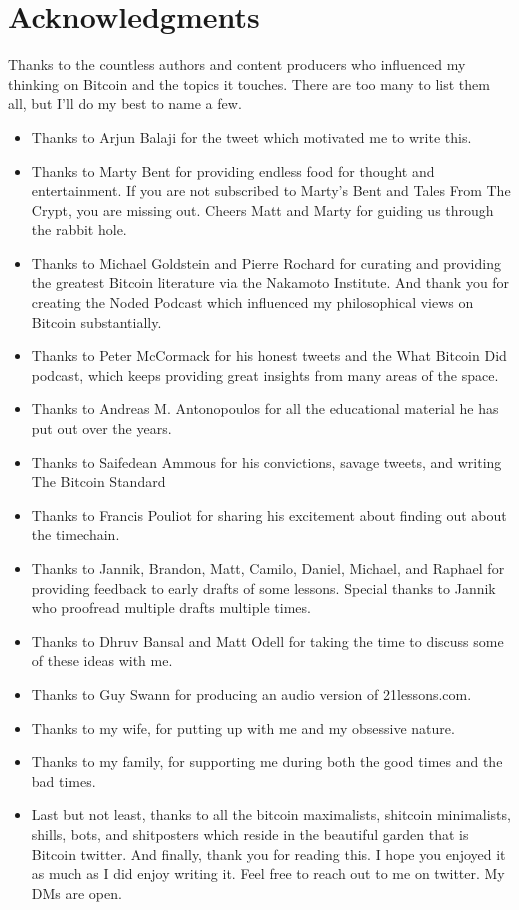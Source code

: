 \chapter*{Acknowledgments}

Thanks to the countless authors and content producers who influenced my thinking
on Bitcoin and the topics it touches. There are too many to list them all, but
I’ll do my best to name a few.

\begin{itemize}
  \item Thanks to Arjun Balaji for the tweet which motivated me to write this.
  \item Thanks to Marty Bent for providing endless food for thought and entertainment. If you are not subscribed to Marty’s Bent and Tales From The Crypt, you are missing out. Cheers Matt and Marty for guiding us through the rabbit hole.
  \item Thanks to Michael Goldstein and Pierre Rochard for curating and providing the greatest Bitcoin literature via the Nakamoto Institute. And thank you for creating the Noded Podcast which influenced my philosophical views on Bitcoin substantially.
  \item Thanks to Peter McCormack for his honest tweets and the What Bitcoin Did podcast, which keeps providing great insights from many areas of the space.
  \item Thanks to Andreas M. Antonopoulos for all the educational material he has put out over the years.
  \item Thanks to Saifedean Ammous for his convictions, savage tweets, and writing The Bitcoin Standard
  \item Thanks to Francis Pouliot for sharing his excitement about finding out about the timechain.
  \item Thanks to Jannik, Brandon, Matt, Camilo, Daniel, Michael, and Raphael for providing feedback to early drafts of some lessons. Special thanks to Jannik who proofread multiple drafts multiple times.
  \item Thanks to Dhruv Bansal and Matt Odell for taking the time to discuss some of these ideas with me.
  \item Thanks to Guy Swann for producing an audio version of 21lessons.com.
  \item Thanks to my wife, for putting up with me and my obsessive nature.
  \item Thanks to my family, for supporting me during both the good times and the bad times.
  \item Last but not least, thanks to all the bitcoin maximalists, shitcoin minimalists, shills, bots, and shitposters which reside in the beautiful garden that is Bitcoin twitter. And finally, thank you for reading this. I hope you enjoyed it as much as I did enjoy writing it. Feel free to reach out to me on twitter. My DMs are open.
\end{itemize}

